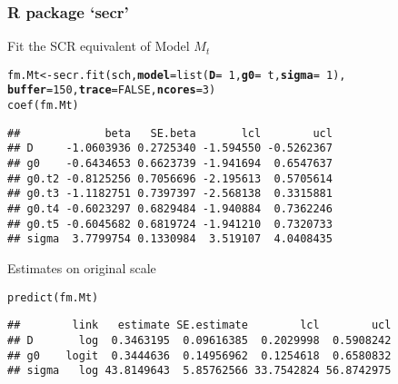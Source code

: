 \documentclass[color=usenames,dvipsnames]{beamer}\usepackage[]{graphicx}\usepackage[]{xcolor}
\makeatletter
\newcommand{\hlnum}[1]{\textcolor[rgb]{0.69,0.494,0}{#1}}%
\newcommand{\hlopt}[1]{\textcolor[rgb]{0,0,0}{#1}}%
\newcommand{\hldef}[1]{\textcolor[rgb]{0,0,0}{#1}}%
\newcommand{\hlkwb}[1]{\textcolor[rgb]{0,0.341,0.682}{#1}}%
\newcommand{\hlkwc}[1]{\textcolor[rgb]{0,0,0}{\textbf{#1}}}%
\newcommand{\hlkwd}[1]{\textcolor[rgb]{0.004,0.004,0.506}{#1}}%
\newenvironment{kframe}{%
 \def\at@end@of@kframe{}%
 \ifinner\ifhmode%
  \def\at@end@of@kframe{\end{minipage}}%
  \begin{minipage}{\columnwidth}%
 \fi\fi%
 \def\FrameCommand##1{\hskip\@totalleftmargin \hskip-\fboxsep
 \colorbox{shadecolor}{##1}\hskip-\fboxsep
     \hskip-\linewidth \hskip-\@totalleftmargin \hskip\columnwidth}%
 \MakeFramed {\advance\hsize-\width
   \@totalleftmargin\z@ \linewidth\hsize
   \@setminipage}}%
 {\par\unskip\endMakeFramed%
 \at@end@of@kframe}
\newenvironment{knitrout}{}{} %
\makeatother
\begin{document}
\begin{frame}[fragile]
  \frametitle{R package `secr'}
  Fit the SCR equivalent of Model $M_t$
\begin{knitrout}\scriptsize
{}\color{fgcolor}\begin{kframe}
\begin{alltt}
\hldef{fm.Mt} \hlkwb{<-} \hlkwd{secr.fit}\hldef{(sch,} \hlkwc{model}\hldef{=}\hlkwd{list}\hldef{(}\hlkwc{D}\hldef{=}\hlopt{~}\hlnum{1}\hldef{,} \hlkwc{g0}\hldef{=}\hlopt{~}\hldef{t,} \hlkwc{sigma}\hldef{=}\hlopt{~}\hlnum{1}\hldef{),}
                  \hlkwc{buffer}\hldef{=}\hlnum{150}\hldef{,} \hlkwc{trace}\hldef{=}\hlnum{FALSE}\hldef{,} \hlkwc{ncores}\hldef{=}\hlnum{3}\hldef{)}
\hlkwd{coef}\hldef{(fm.Mt)}
\end{alltt}
\begin{verbatim}
##             beta   SE.beta       lcl        ucl
## D     -1.0603936 0.2725340 -1.594550 -0.5262367
## g0    -0.6434653 0.6623739 -1.941694  0.6547637
## g0.t2 -0.8125256 0.7056696 -2.195613  0.5705614
## g0.t3 -1.1182751 0.7397397 -2.568138  0.3315881
## g0.t4 -0.6023297 0.6829484 -1.940884  0.7362246
## g0.t5 -0.6045682 0.6819724 -1.941210  0.7320733
## sigma  3.7799754 0.1330984  3.519107  4.0408435
\end{verbatim}
\end{kframe}
\end{knitrout}
\pause
\vfill
Estimates on original scale
\begin{knitrout}\scriptsize
{}\color{fgcolor}\begin{kframe}
\begin{alltt}
\hlkwd{predict}\hldef{(fm.Mt)}
\end{alltt}
\begin{verbatim}
##        link   estimate SE.estimate        lcl        ucl
## D       log  0.3463195  0.09616385  0.2029998  0.5908242
## g0    logit  0.3444636  0.14956962  0.1254618  0.6580832
## sigma   log 43.8149643  5.85762566 33.7542824 56.8742975
\end{verbatim}
\end{kframe}
\end{knitrout}
\end{frame}
\end{document}
